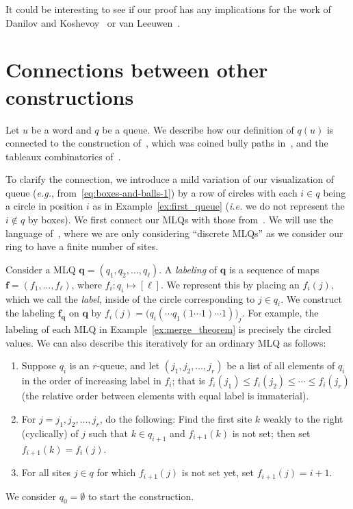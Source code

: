 \documentclass[reqno]{amsart}
\newcommand{\0}{\phantom{c}}
\newcommand{\qq}{\mathbf{q}}
\newcommand{\ff}{\mathbf{f}}
\newcommand{\tup}[1]{\left( #1 \right)}
\newcommand{\ive}[1]{\left[ #1 \right]}
\newcommand{\defn}[1]{{\color{darkred}\emph{#1}}} %
\theoremstyle{plain}
\theoremstyle{definition}
\numberwithin{equation}{section}
\begin{document}
It could be interesting to see if our proof has any implications for the work of Danilov and Koshevoy~\cite{DanilovKoshevoy} or van Leeuwen~\cite{vanLeeuwen-dc}.






\appendix

\section{Connections between other constructions}
\label{app:queue-relations}

Let $u$ be a word and $q$ be a queue.
We describe how our definition of $q(u)$ is connected to the construction of~\cite{FM07}, which was coined bully paths in~\cite{AasLin17}, and the tableaux combinatorics of~\cite{AssSea18}.

To clarify the connection, we introduce a mild variation of our visualization of queue (\textit{e.g.}, from~\eqref{eq:boxes-and-balls-1}) by a row of circles with each $i \in q$ being a circle in position $i$ as in Example~\ref{ex:first_queue} (\textit{i.e.} we do not represent the $i \notin q$ by boxes).
We first connect our MLQs with those from~\cite{FM07}.
We will use the language of~\cite{AL17}, where we are only considering ``discrete MLQs'' as we consider our ring to have a finite number of sites.

Consider a MLQ $\qq = (q_1, q_2, \dotsc, q_{\ell})$.
A \defn{labeling} of $\qq$ is a sequence of maps $\ff = (f_1, \dotsc, f_{\ell})$, where $f_i \colon q_i \mapsto \ive{\ell}$.
We represent this by placing an $f_i(j)$, which we call the \defn{label}, inside of the circle corresponding to $j \in q_i$.
We construct the labeling $\ff_{\qq}$ on $\qq$ by $f_i(j) = \bigl( q_i( \cdots q_1(1 \cdots 1) \cdots 1) \bigr)_j$.
For example, the labeling of each MLQ in Example~\ref{ex:merge_theorem} is precisely the circled values.
We can also describe this iteratively for an ordinary MLQ as follows:
\begin{enumerate}
\item Suppose $q_i$ is an $r$-queue, and let $\tup{j_1, j_2, \ldots, j_r}$ be a list of all elements of $q_i$ in the order of increasing label in $f_i$; that is $f_i(j_1) \leq f_i(j_2) \leq \cdots \leq f_i(j_r)$ (the relative order between elements with equal label is immaterial).
\item For $j = j_1, j_2, \ldots, j_{r}$, do the following:
    Find the first site $k$ weakly to the right (cyclically) of $j$ such that $k \in q_{i+1}$ and $f_{i+1}(k)$ is not set; then set $f_{i+1}(k) = f_i(j)$.
\item For all sites $j \in q$ for which $f_{i+1}(j)$ is not set yet, set $f_{i+1}(j) = i+1$.
\end{enumerate}
We consider $q_0 = \emptyset$ to start the construction.
\end{document}
